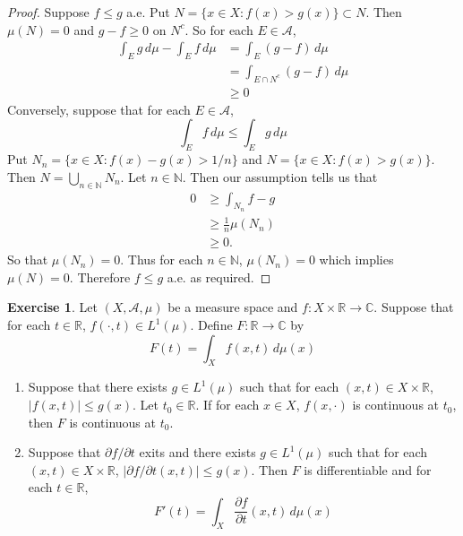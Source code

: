 \documentclass[12pt]{amsart}
\theoremstyle{definition}
\newtheorem{ex}[definition]{Exercise}
\newcommand{\C}{\mathbb{C}}
\newcommand{\N}{\mathbb{N}}
\newcommand{\R}{\mathbb{R}}
\newcommand{\MA}{\mathcal{A}}
\newcommand{\dmu}{\, d \mu}
\newcommand{\p}{\partial}
\newcommand{\lex}[1]{\label{ex:#1}}
\begin{document}
	\begin{proof}
		Suppose $f \leq g$ a.e. Put $N = \{x\in X: f(x) > g(x)\} \subset N$. Then $\mu(N) = 0$ and $g-f \geq 0$ on $N^c$. So for each $E \in \MA$,
		\begin{align*}
			\int_E g \dmu - \int_E f \dmu 
			&= \int_E (g-f) \dmu\\
			&= \int_{E \cap N^c} (g-f) \dmu\\
			& \geq 0
		\end{align*} 
		Conversely, suppose that for each $E \in \MA$, 
		$$\int_E f\dmu \leq \int_E g \dmu$$ 
		Put $N_n = \{x \in X: f(x) - g(x) > 1/n\}$ and $N = \{x \in X: f(x) > g(x)\}$. Then $N = \bigcup\limits_{n \in \N}N_n$. Let $n \in \N$. Then our assumption tells us that 
		\begin{align*}
			0 
			&\geq \int_{N_n} f-g\\
			& \geq \frac{1}{n} \mu(N_n)\\
			& \geq 0.
		\end{align*} 
		So that $\mu(N_n) = 0$. Thus for each $n \in \N$, $\mu(N_n) = 0$ which implies $\mu(N) = 0$. Therefore $f \leq g$ a.e. as required. 
	\end{proof}
	
	\begin{ex} \lex{00000} 
	Let $(X, \MA, \mu)$ be a measure space and $f:X \times \R \rightarrow \C$. Suppose that for each $t \in \R$, $f(\cdot, t) \in L^1(\mu)$. Define $F: \R \rightarrow \C$ by 
	$$F(t) = \int_X f(x, t) \dmu(x)$$ 
	\begin{enumerate}
	\item Suppose that there exists $g \in L^1(\mu)$ such that for each $(x, t) \in X \times \R$, $|f(x,t)| \leq g(x)$. Let $t_0 \in \R$. If for each $x \in X$, $f(x, \cdot)$ is continuous at $t_0$, then $F$ is continuous at $t_0$. 
 	\item Suppose that $\p f / \p t$ exits and there exists $g \in L^1(\mu)$ such that for each $(x, t) \in X \times \R$, $|\p f / \p t(x,t) | \leq g(x)$. Then $F$ is differentiable and for each $t \in \R$, $$F'(t) = \int_X \frac{\p f}{\p t}(x, t) \dmu(x)$$
	\end{enumerate}
	\end{ex}
	
\end{document}
